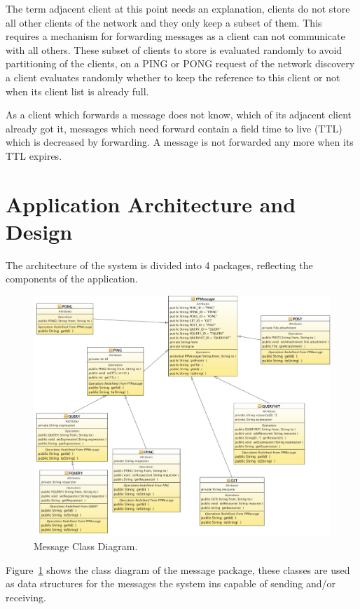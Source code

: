 \documentclass{article}
\begin{document}
The term adjacent client at this point needs an explanation, clients do not
store all other clients of the network and they only keep a subset of them. This
requires a mechanism for forwarding messages as a client can not communicate with
all others. These subset of clients to store is evaluated randomly to avoid
partitioning of the clients, on a PING or PONG request of the network discovery a
client evaluates randomly whether to keep the reference to this client or not
when its client list is already full.

As a client which forwards a message does not know, which of its adjacent
client already got it, messages which need forward contain a field time to
live (TTL) which is decreased by forwarding. A message is not forwarded any
more when its TTL expires.

\section{Application Architecture and Design}

The architecture of the system is divided into 4 packages, reflecting the
components of the application.

\begin{figure}[!hbtp]
\centering
\includegraphics[width=\textwidth]{../img/MessagesClassDiagram.pdf}
\caption{Message Class Diagram.}
\label{fig:messageclassdia}
\end{figure}
Figure~\ref{fig:messageclassdia} shows the class diagram of the message package,
these classes are used as data structures for the messages the system ins
capable of sending and/or receiving.
\end{document}
